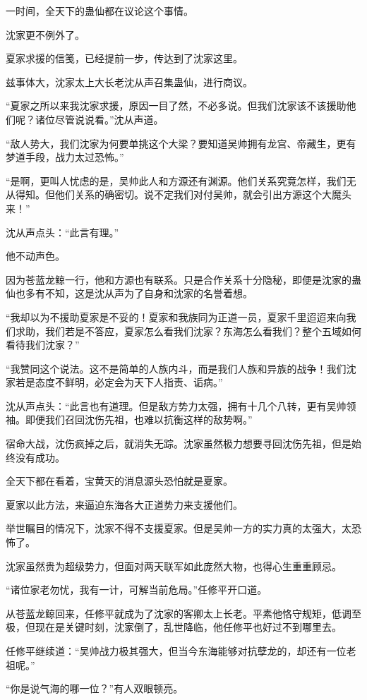 \begin{this_body}
一时间，全天下的蛊仙都在议论这个事情。

沈家更不例外了。

夏家求援的信笺，已经提前一步，传达到了沈家这里。

兹事体大，沈家太上大长老沈从声召集蛊仙，进行商议。

“夏家之所以来我沈家求援，原因一目了然，不必多说。但我们沈家该不该援助他们呢？诸位尽管说说看。”沈从声道。

“敌人势大，我们沈家为何要单挑这个大梁？要知道吴帅拥有龙宫、帝藏生，更有梦道手段，战力太过恐怖。”

“是啊，更叫人忧虑的是，吴帅此人和方源还有渊源。他们关系究竟怎样，我们无从得知。但他们关系的确密切。说不定我们对付吴帅，就会引出方源这个大魔头来！”

沈从声点头：“此言有理。”

他不动声色。

因为苍蓝龙鲸一行，他和方源也有联系。只是合作关系十分隐秘，即便是沈家的蛊仙也多有不知，这是沈从声为了自身和沈家的名誉着想。

“我却以为不援助夏家是不妥的！夏家和我族同为正道一员，夏家千里迢迢来向我们求助，我们若是不答应，夏家怎么看我们沈家？东海怎么看我们？整个五域如何看待我们沈家？”

“我赞同这个说法。这不是简单的人族内斗，而是我们人族和异族的战争！我们沈家若是态度不鲜明，必定会为天下人指责、诟病。”

沈从声点头：“此言也有道理。但是敌方势力太强，拥有十几个八转，更有吴帅领袖。即便我们召回沈伤先祖，也难以抗衡这样的敌势啊。”

宿命大战，沈伤疯掉之后，就消失无踪。沈家虽然极力想要寻回沈伤先祖，但是始终没有成功。

全天下都在看着，宝黄天的消息源头恐怕就是夏家。

夏家以此方法，来逼迫东海各大正道势力来支援他们。

举世瞩目的情况下，沈家不得不支援夏家。但是吴帅一方的实力真的太强大，太恐怖了。

沈家虽然贵为超级势力，但面对两天联军如此庞然大物，也得心生重重顾忌。

“诸位家老勿忧，我有一计，可解当前危局。”任修平开口道。

从苍蓝龙鲸回来，任修平就成为了沈家的客卿太上长老。平素他恪守规矩，低调至极，但现在是关键时刻，沈家倒了，乱世降临，他任修平也好过不到哪里去。

任修平继续道：“吴帅战力极其强大，但当今东海能够对抗孽龙的，却还有一位老祖呢。”

“你是说气海的哪一位？”有人双眼顿亮。


\end{this_body}
